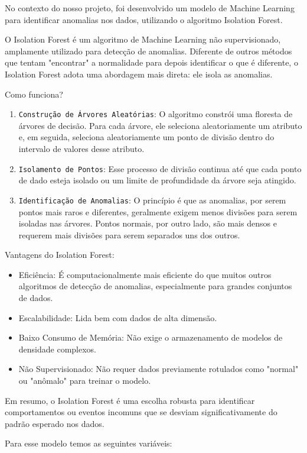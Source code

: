 \documentclass[12pt, a4paper]{article}
\begin{document}
No contexto do nosso projeto, foi desenvolvido um modelo de Machine Learning para identificar anomalias nos dados, utilizando o algoritmo Isolation Forest.

O Isolation Forest é um algoritmo de Machine Learning não supervisionado, amplamente utilizado para detecção de anomalias. Diferente de outros métodos que tentam "encontrar" a normalidade para depois identificar o que é diferente, o Isolation Forest adota uma abordagem mais direta: ele isola as anomalias.

Como funciona?
\begin{enumerate}
	\item \texttt{Construção de Árvores Aleatórias}: O algoritmo constrói uma floresta de árvores de decisão. Para cada árvore, ele seleciona aleatoriamente um atributo e, em seguida, seleciona aleatoriamente um ponto de divisão dentro do intervalo de valores desse atributo.
	\item \texttt{Isolamento de Pontos}: Esse processo de divisão continua até que cada ponto de dado esteja isolado ou um limite de profundidade da árvore seja atingido.
	\item \texttt{Identificação de Anomalias}: O princípio é que as anomalias, por serem pontos mais raros e diferentes, geralmente exigem menos divisões para serem isoladas nas árvores. Pontos normais, por outro lado, são mais densos e requerem mais divisões para serem separados uns dos outros.
\end{enumerate}

Vantagens do Isolation Forest:

\begin{itemize}
	\item Eficiência: É computacionalmente mais eficiente do que muitos outros algoritmos de detecção de anomalias, especialmente para grandes conjuntos de dados.
	\item Escalabilidade: Lida bem com dados de alta dimensão.
	\item Baixo Consumo de Memória: Não exige o armazenamento de modelos de densidade complexos.
	\item Não Supervisionado: Não requer dados previamente rotulados como "normal" ou "anômalo" para treinar o modelo.
\end{itemize}

Em resumo, o Isolation Forest é uma escolha robusta para identificar comportamentos ou eventos incomuns que se desviam significativamente do padrão esperado nos dados.

Para esse modelo temos as seguintes variáveis:
\end{document}
